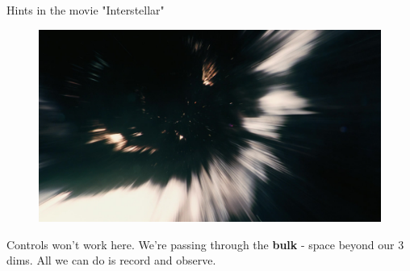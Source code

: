 \documentclass{beamer}
\begin{document}
\begin{frame}{Hints in the movie "Interstellar"}
		\begin{figure}
	\includegraphics[width=\textwidth]{images/1198701.jpg}
\end{figure}
Controls won't work here. We're passing through the \textbf{bulk} - space beyond our 3 dims. All we can do is record and observe.

\end{frame}
\end{document}
